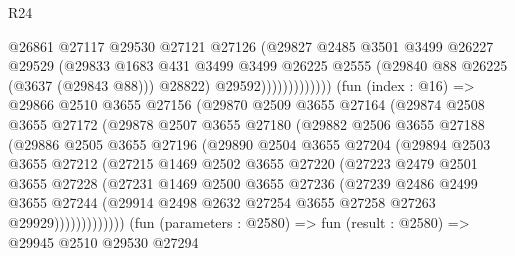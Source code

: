 \begin{lexlean}{R24}
\begin{coremodule}
                                @26861
                                @27117
                                @29530
                                @27121
                                @27126
                                (@29827
                                  @2485
                                  @3501
                                  @3499
                                  @26227
                                  @29529
                                  (@29833
                                    @1683
                                    @431
                                    @3499
                                    @3499
                                    @26225
                                    @2555
                                    (@29840 @88 @26225 (@3637 (@29843 @88)))
                                    @28822)
                                  @29592)))))))))))))
        (fun (index : @16) =>
        @29866
          @2510
          @3655
          @27156
          (@29870
            @2509
            @3655
            @27164
            (@29874
              @2508
              @3655
              @27172
              (@29878
                @2507
                @3655
                @27180
                (@29882
                  @2506
                  @3655
                  @27188
                  (@29886
                    @2505
                    @3655
                    @27196
                    (@29890
                      @2504
                      @3655
                      @27204
                      (@29894
                        @2503
                        @3655
                        @27212
                        (@27215
                          @1469
                          @2502
                          @3655
                          @27220
                          (@27223
                            @2479
                            @2501
                            @3655
                            @27228
                            (@27231
                              @1469
                              @2500
                              @3655
                              @27236
                              (@27239
                                @2486
                                @2499
                                @3655
                                @27244
                                (@29914 @2498 @2632 @27254 @3655 @27258 @27263 @29929)))))))))))))
        (fun (parameters : @2580) =>
        fun (result : @2580) =>
        @29945
          @2510
          @29530
          @27294

\end{coremodule}
\end{lexlean}
